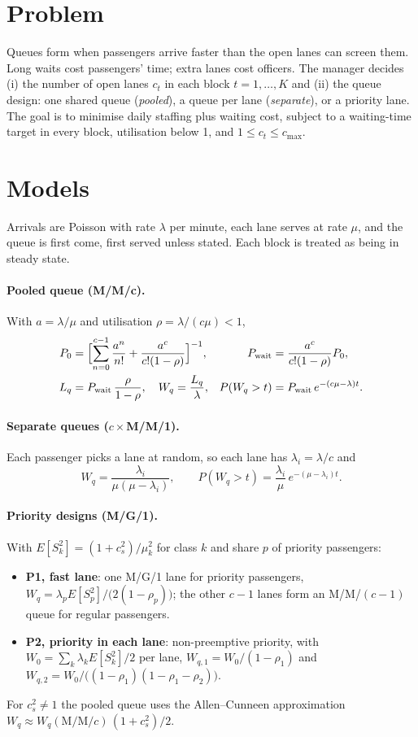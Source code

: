 \documentclass[11pt,a4paper]{article}
\newcommand{\Wq}{W_q}
\begin{document}
\section{Problem}
Queues form when passengers arrive faster than the open lanes can screen them. Long waits cost passengers' time; extra lanes cost officers. The manager decides (i) the number of open lanes $c_t$ in each block $t=1,\dots,K$ and (ii) the queue design: one shared queue (\emph{pooled}), a queue per lane (\emph{separate}), or a priority lane. The goal is to minimise daily staffing plus waiting cost, subject to a waiting-time target in every block, utilisation below 1, and $1 \le c_t \le c_{\max}$.

\section{Models}
Arrivals are Poisson with rate $\lambda$ per minute, each lane serves at rate $\mu$, and the queue is first come, first served unless stated. Each block is treated as being in steady state.

\paragraph{Pooled queue (M/M/c).} With $a=\lambda/\mu$ and utilisation $\rho = \lambda/(c\mu)<1$,
\begin{align*}
P_0 &= \Bigl[\sum_{n=0}^{c-1}\frac{a^n}{n!} + \frac{a^c}{c!(1-\rho)}\Bigr]^{-1}, &
P_{\text{wait}} &= \frac{a^c}{c!(1-\rho)}P_0,\\
L_q &= P_{\text{wait}}\,\frac{\rho}{1-\rho}, \quad \Wq = \frac{L_q}{\lambda}, &
P(\Wq>t) &= P_{\text{wait}}\,e^{-(c\mu-\lambda)t}.
\end{align*}

\paragraph{Separate queues ($c\times$M/M/1).} Each passenger picks a lane at random, so each lane has $\lambda_i=\lambda/c$ and
\[
\Wq = \frac{\lambda_i}{\mu(\mu-\lambda_i)}, \qquad P(\Wq>t) = \frac{\lambda_i}{\mu}\,e^{-(\mu-\lambda_i)t}.
\]

\paragraph{Priority designs (M/G/1).} With $E[S_k^2]=(1+c_s^2)/\mu_k^2$ for class $k$ and share $p$ of priority passengers:
\begin{itemize}
\item \textbf{P1, fast lane}: one M/G/1 lane for priority passengers, $\Wq=\lambda_p E[S_p^2]/\bigl(2(1-\rho_p)\bigr)$; the other $c-1$ lanes form an M/M/$(c-1)$ queue for regular passengers.
\item \textbf{P2, priority in each lane}: non-preemptive priority, with $W_0=\sum_k \lambda_{k}E[S_k^2]/2$ per lane, $W_{q,1}=W_0/(1-\rho_1)$ and $W_{q,2}=W_0/\bigl((1-\rho_1)(1-\rho_1-\rho_2)\bigr)$.
\end{itemize}
For $c_s^2\ne1$ the pooled queue uses the Allen--Cunneen approximation $\Wq\approx\Wq(\text{M/M/}c)\,(1+c_s^2)/2$.
\end{document}
